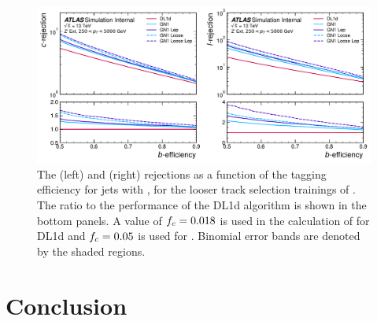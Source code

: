 \begin{figure}[!htbp]
    \centering
    \includegraphics[width=\textwidth]{chapters/gnn_tagger/figs/gn1_loose_zprime.pdf}
    \caption{
        The \cjet (left) and \ljet (right) rejections as a function of the \bjet tagging efficiency for \Zprime jets with \Zprimept, for the looser track selection trainings of \GNN.
        The ratio to the performance of the DL1d algorithm is shown in the bottom panels.
        A value of $f_c = 0.018$ is used in the calculation of \Db for DL1d and $f_c = 0.05$ is used for \GNN.
        Binomial error bands are denoted by the shaded regions.
    }
    \label{fig:zprime_gn1_loose}
\end{figure}




\section{Conclusion}\label{sec:gnn_conclusion}


